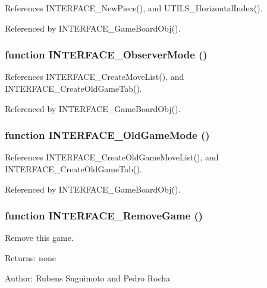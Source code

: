 References INTERFACE\_\-NewPiece(), and UTILS\_\-HorizontalIndex().

Referenced by INTERFACE\_\-GameBoardObj().
\subsubsection[INTERFACE\_\-ObserverMode]{\setlength{\rightskip}{0pt plus 5cm}function INTERFACE\_\-ObserverMode ()}\label{interface_2game_8js_c1b1081bff6d65c4491e33d04943d304}




References INTERFACE\_\-CreateMoveList(), and INTERFACE\_\-CreateOldGameTab().

Referenced by INTERFACE\_\-GameBoardObj().
\subsubsection[INTERFACE\_\-OldGameMode]{\setlength{\rightskip}{0pt plus 5cm}function INTERFACE\_\-OldGameMode ()}\label{interface_2game_8js_07f5f4ae5a8ce00cb7fcd6f69649092c}




References INTERFACE\_\-CreateOldGameMoveList(), and INTERFACE\_\-CreateOldGameTab().

Referenced by INTERFACE\_\-GameBoardObj().
\subsubsection[INTERFACE\_\-RemoveGame]{\setlength{\rightskip}{0pt plus 5cm}function INTERFACE\_\-RemoveGame ()}\label{interface_2game_8js_5317b4a555409c7b6b24d294395c069a}


Remove this game. 

\begin{Desc}
\item[Returns:]none \end{Desc}
\begin{Desc}
\item[Author:]Rubens Suguimoto and Pedro Rocha \end{Desc}


